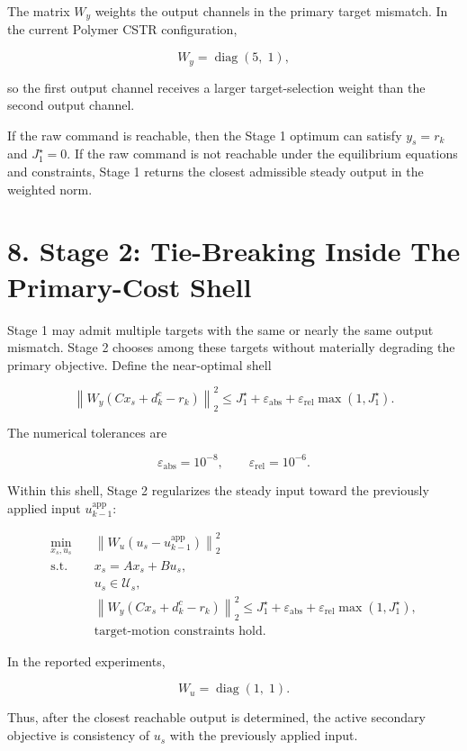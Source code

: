 \documentclass[11pt]{article}
\begin{document}
The matrix $W_y$ weights the output channels in the primary target mismatch. In the current Polymer CSTR configuration,


\[
W_y=\operatorname{diag}(5,\;1),
\]

so the first output channel receives a larger target-selection weight than the second output channel.


If the raw command is reachable, then the Stage 1 optimum can satisfy $y_s=r_k$ and $J_1^\star=0$. If the raw command is not reachable under the equilibrium equations and constraints, Stage 1 returns the closest admissible steady output in the weighted norm.


\section*{8. Stage 2: Tie-Breaking Inside The Primary-Cost Shell}

Stage 1 may admit multiple targets with the same or nearly the same output mismatch. Stage 2 chooses among these targets without materially degrading the primary objective. Define the near-optimal shell


\[
\left\|
W_y(Cx_s+d^c_k-r_k)
\right\|_2^2
\le
J_1^\star
+
\varepsilon_{\mathrm{abs}}
+
\varepsilon_{\mathrm{rel}}\max(1,J_1^\star).
\]

The numerical tolerances are


\[
\varepsilon_{\mathrm{abs}}=10^{-8},
\qquad
\varepsilon_{\mathrm{rel}}=10^{-6}.
\]

Within this shell, Stage 2 regularizes the steady input toward the previously applied input $u_{k-1}^{\mathrm{app}}$:


\[
\begin{aligned}
\min_{x_s,u_s}
\quad&
\left\|
W_u(u_s-u_{k-1}^{\mathrm{app}})
\right\|_2^2\\
\text{s.t.}\quad&
x_s=A x_s+B u_s,\\
&
u_s\in\mathcal U_s,\\
&
\left\|
W_y(Cx_s+d^c_k-r_k)
\right\|_2^2
\le
J_1^\star
+
\varepsilon_{\mathrm{abs}}
+
\varepsilon_{\mathrm{rel}}\max(1,J_1^\star),\\
&
\text{target-motion constraints hold.}
\end{aligned}
\]

In the reported experiments,


\[
W_u=\operatorname{diag}(1,\;1).
\]

Thus, after the closest reachable output is determined, the active secondary objective is consistency of $u_s$ with the previously applied input.
\end{document}
